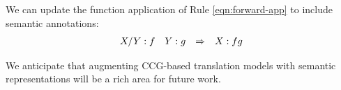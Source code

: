 \documentclass[a4paper]{article}
\newcommand\anonymize[1]{}
\begin{document}
We can update the function application of Rule \ref{eqn:forward-app} to include semantic annotations:
\begin{equation*}
\begin{array}{cccc} X/Y:f & Y:g & \Rightarrow & X:fg \end{array}
\end{equation*}

We anticipate that augmenting CCG-based translation models with semantic representations will be a rich area for future work.

\anonymize{
\section{Acknowledgements*}
Michael Auli, ???, funding sources
}



\end{document}
